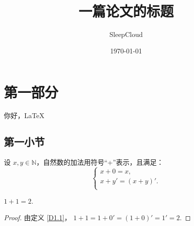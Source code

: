 



\title{一篇论文的标题}
\author{SleepCloud}
\date{\today}
\maketitle

\section{第一部分}	
你好，\LaTeX

\subsection{第一小节}

\begin{defn}\label{D1.1}
	设 $ x,y \in \mathbb{N} $，自然数的加法用符号“+”表示，且满足：
	\[ \left\{ \begin{array}{l}
		x+0 = x, \\
		x+y' = (x+y)'. \\
	\end{array} \right. \]
\end{defn}

\begin{thm}[定理名]
	$ 1+1 = 2 $.
\end{thm}

\begin{proof}
	由定义 \ref{D1.1}，
	$ 1+1 = 1+0' = (1+0)' = 1' = 2 $.
\end{proof}


